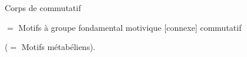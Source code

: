 Corps de  commutatif

$=$ Motifs à groupe fondamental motivique [connexe] commutatif

($=$ Motifs métabéliens).
